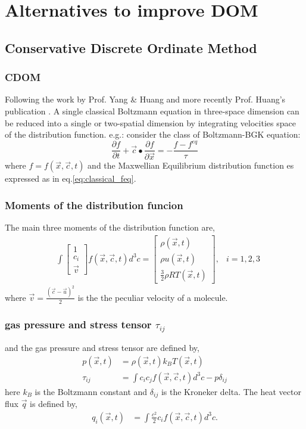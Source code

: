 \section{Alternatives to improve DOM}
\subsection{Conservative Discrete Ordinate Method}

\begin{frame}
	\frametitle{CDOM}
Following the work by Prof. Yang \& Huang \cite{Yang1995323} and more recently Prof. Huang's publication \cite{Huang2011261}. A single classical Boltzmann equation in three-space dimension can be reduced into a single or two-spatial dimension by integrating  velocities space of the distribution function. e.g.: consider the class of Boltzmann-BGK equation:
	\begin{equation}
		\frac{\partial f}{\partial t} + \vec{c} \bullet \frac{\partial f}{\partial \vec{x}} = -\frac{f - f^{eq}}{\tau}
	\end{equation}
	where $f = f (\vec{x},\vec{c},t)$ and the Maxwellian Equilibrium distribution function es expressed as in eq.\ref{eq:classical_feq}.
\end{frame}

\begin{frame}
	\frametitle{Moments of the distribution funcion}
	The main three moments of the distribution function are,
	\begin{align*}
		&\int{
		\begin{bmatrix}
			1 			\\
			c_i 		\\
			\vec{v}
		\end{bmatrix}
		} f(\vec{x},\vec{c},t)d^3c = 
		\begin{bmatrix}
			\rho(\vec{x},t)		\\
			\rho u(\vec{x},t)	\\
			\frac{3}{2}\rho RT(\vec{x},t)
		\end{bmatrix}, & i = 1,2,3
	\end{align*}
	where $\vec{v} = \frac{(\vec{c}-\vec{u})^2}{2}$ is the the peculiar velocity of a molecule.
\end{frame}

\begin{frame}
	\frametitle{gas pressure and stress tensor $\tau_{ij}$}
		and the gas pressure and stress tensor are defined by,
		\begin{align*}
			p(\vec{x},t) &= \rho(\vec{x},t) k_B T(\vec{x},t) \\
			\tau_{ij} &= \int c_i c_j f(\vec{x},\vec{c},t) d^3c - p\delta_{ij}
		\end{align*}
		here $k_B$ is the Boltzmann constant and $\delta_{ij}$ is the Kroneker delta.
		The heat vector flux $\vec{q}$ is defined by,
		\begin{align*}
			q_i (\vec{x},t) &= \int \frac{c^2}{2} c_i f(\vec{x},\vec{c},t)d^3c.
		\end{align*}
\end{frame}

